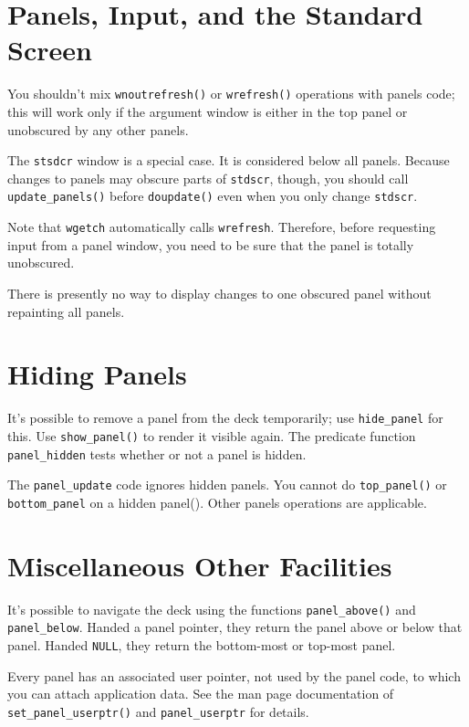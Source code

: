 \section{Panels, Input, and the Standard Screen}

\label{f0:pstdscr}You shouldn't mix \texttt{wnoutrefresh()} or \texttt{wrefresh()}
operations with panels code; this will work only if the argument window
is either in the top panel or unobscured by any other panels. 

The \texttt{stsdcr} window is a special case.  It is considered below all
panels.  Because changes to panels may obscure parts of \texttt{stdscr},
though, you should call \texttt{update\_panels()} before
\texttt{doupdate()} even when you only change \texttt{stdscr}. 

Note that \texttt{wgetch} automatically calls \texttt{wrefresh}.
Therefore, before requesting input from a panel window, you need to be sure
that the panel is totally unobscured. 

There is presently no way to display changes to one obscured panel without
repainting all panels.

\section{Hiding Panels}

\label{f0:hiding}It's possible to remove a panel from the deck temporarily; use
\texttt{hide\_panel} for this.  Use \texttt{show\_panel()} to render it
visible again.  The predicate function \texttt{panel\_hidden}
tests whether or not a panel is hidden. 

The \texttt{panel\_update} code ignores hidden panels.  You cannot do
\texttt{top\_panel()} or \texttt{bottom\_panel} on a hidden panel().
Other panels operations are applicable.

\section{Miscellaneous Other Facilities}

\label{f0:pmisc}It's possible to navigate the deck using the functions
\texttt{panel\_above()} and \texttt{panel\_below}.  Handed a panel
pointer, they return the panel above or below that panel.  Handed
\texttt{NULL}, they return the bottom-most or top-most panel. 

Every panel has an associated user pointer, not used by the panel code, to
which you can attach application data.  See the man page documentation
of \texttt{set\_panel\_userptr()} and \texttt{panel\_userptr} for
details.

